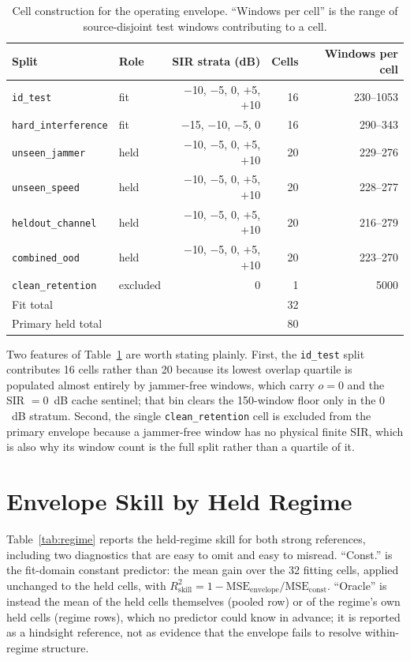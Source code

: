\documentclass[letterpaper,onecolumn,11pt,journal]{IEEEtran}
\begin{document}
\begin{table}[t]
\centering
\caption{Cell construction for the operating envelope. ``Windows per cell'' is
the range of source-disjoint test windows contributing to a cell.}
\label{tab:cells}
\footnotesize
\setlength{\tabcolsep}{3pt}
\begin{tabular}{llrrr}
\toprule
Split & Role & SIR strata (dB) & Cells & Windows per cell\\
\midrule
\texttt{id\_test} & fit & $-$10, $-$5, 0, $+$5, $+$10 & 16 & 230--1053\\
\texttt{hard\_interference} & fit & $-$15, $-$10, $-$5, 0 & 16 & 290--343\\
\texttt{unseen\_jammer} & held & $-$10, $-$5, 0, $+$5, $+$10 & 20 & 229--276\\
\texttt{unseen\_speed} & held & $-$10, $-$5, 0, $+$5, $+$10 & 20 & 228--277\\
\texttt{heldout\_channel} & held & $-$10, $-$5, 0, $+$5, $+$10 & 20 & 216--279\\
\texttt{combined\_ood} & held & $-$10, $-$5, 0, $+$5, $+$10 & 20 & 223--270\\
\texttt{clean\_retention} & excluded & $0$ & 1 & 5000\\
\midrule
\multicolumn{3}{l}{Fit total} & 32 & \\
\multicolumn{3}{l}{Primary held total} & 80 & \\
\bottomrule
\end{tabular}
\end{table}

Two features of Table~\ref{tab:cells} are worth stating plainly. First, the
\texttt{id\_test} split contributes 16 cells rather than 20 because its lowest
overlap quartile is populated almost entirely by jammer-free windows, which
carry $o=0$ and the SIR $=0$~dB cache sentinel; that bin clears the 150-window
floor only in the $0$~dB stratum. Second, the single
\texttt{clean\_retention} cell is excluded from the primary envelope because a
jammer-free window has no physical finite SIR, which is also why its window
count is the full split rather than a quartile of it.

\section{Envelope Skill by Held Regime}
Table~\ref{tab:regime} reports the held-regime skill for both strong
references, including two diagnostics that are easy to omit and easy to
misread. ``Const.'' is the fit-domain constant predictor: the mean gain over
the 32 fitting cells, applied unchanged to the held cells, with
$R^2_{\mathrm{skill}}=1-\mathrm{MSE}_{\mathrm{envelope}}/\mathrm{MSE}_{\mathrm{const}}$.
``Oracle'' is instead the mean of the held cells themselves (pooled row) or of
the regime's own held cells (regime rows), which no predictor could know in
advance; it is reported as a hindsight reference, not as evidence that the
envelope fails to resolve within-regime structure.
\end{document}
